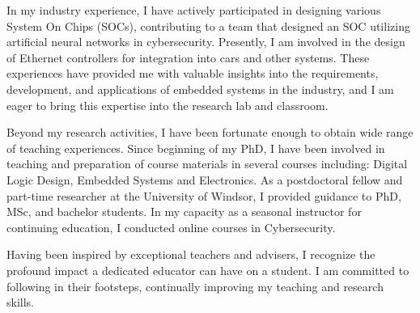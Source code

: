\documentclass[12pt,oneside]{book}
\begin{document}
In my industry experience, I have actively participated in designing various System On Chips (SOCs), contributing to a team that designed an SOC utilizing artificial neural networks in cybersecurity. Presently, I am involved in the design of Ethernet controllers for integration into cars and other systems. These experiences have provided me with valuable insights into the requirements, development, and applications of embedded systems in the industry, and I am eager to bring this expertise into the research lab and classroom.

%
 
Beyond my research activities, I have been fortunate enough to obtain wide range of teaching experiences. Since beginning  of my PhD, I have been involved in teaching and preparation of course materials in several courses including: Digital Logic Design, Embedded Systems and Electronics. 
As a postdoctoral fellow and part-time researcher at the University of Windsor, I provided guidance to PhD, MSc, and bachelor students. In my capacity as a seasonal instructor for continuing education, I conducted online courses in Cybersecurity.

Having been inspired by exceptional teachers and advisers, I recognize the profound impact a dedicated educator can have on a student. I am committed to following in their footsteps, continually improving my teaching and research skills.
\end{document}
